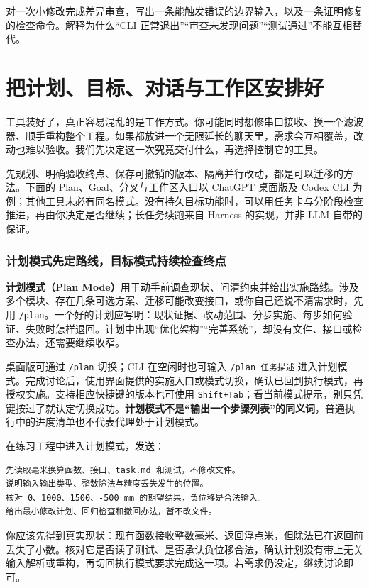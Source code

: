 \begin{exercise}\label{ex:ai-cli-review}
对一次小修改完成差异审查，写出一条能触发错误的边界输入，以及一条证明修复的检查命令。解释为什么“CLI 正常退出”“审查未发现问题”“测试通过”不能互相替代。
\end{exercise}

\section{把计划、目标、对话与工作区安排好}
\label{sec:ai-workflow}

工具装好了，真正容易混乱的是工作方式。你可能同时想修串口接收、换一个滤波器、顺手重构整个工程。如果都放进一个无限延长的聊天里，需求会互相覆盖，改动也难以验收。我们先决定这一次究竟交付什么，再选择控制它的工具。

先规划、明确验收终点、保存可撤销的版本、隔离并行改动，都是可以迁移的方法。下面的 Plan、Goal、分叉与工作区入口以 ChatGPT 桌面版及 Codex CLI 为例；其他工具未必有同名模式。没有持久目标功能时，可以用任务卡与分阶段检查推进，再由你决定是否继续；长任务续跑来自 Harness 的实现，并非 LLM 自带的保证。

\subsubsection{计划模式先定路线，目标模式持续检查终点}

\textbf{计划模式（Plan Mode）}用于动手前调查现状、问清约束并给出实施路线。涉及多个模块、存在几条可选方案、迁移可能改变接口，或你自己还说不清需求时，先用 \texttt{/plan}。一个好的计划应写明：现状证据、改动范围、分步实施、每步如何验证、失败时怎样退回。计划中出现“优化架构”“完善系统”，却没有文件、接口或检查办法，还需要继续收窄。

桌面版可通过 \texttt{/plan} 切换；CLI 在空闲时也可输入 \texttt{/plan 任务描述} 进入计划模式。完成讨论后，使用界面提供的实施入口或模式切换，确认已回到执行模式，再授权实施。支持相应快捷键的版本也可使用 \texttt{Shift+Tab}；看当前模式提示，别只凭键按过了就认定切换成功。\textbf{计划模式不是“输出一个步骤列表”的同义词}，普通执行中的进度清单也不代表代理处于计划模式。

\begin{example}[先规划一次数值换算的修复]
在练习工程中进入计划模式，发送：
\begin{lstlisting}[language={}]
先读取毫米换算函数、接口、task.md 和测试，不修改文件。
说明输入输出类型、整数除法与精度丢失发生的位置。
核对 0、1000、1500、-500 mm 的期望结果，负位移是合法输入。
给出最小修改计划、回归检查和撤回办法，暂不改文件。
\end{lstlisting}
你应该先得到真实现状：现有函数接收整数毫米、返回浮点米，但除法已在返回前丢失了小数。核对它是否读了测试、是否承认负位移合法，确认计划没有带上无关输入解析或重构，再切回执行模式要求完成这一项。若需求仍没定，继续讨论即可。
\end{example}

